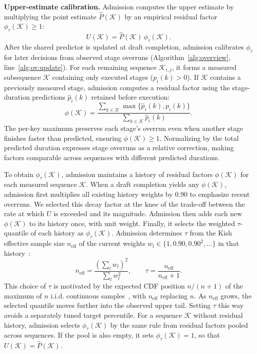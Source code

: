 \smallskip\noindent\textbf{Upper-estimate calibration.}
Admission computes the upper estimate by multiplying the point estimate \(\hat P(\mathcal K)\) by an empirical residual factor \(\phi_\tau(\mathcal K)\geq1\):
\begin{equation*}
  U(\mathcal{K})
  =\hat P(\mathcal{K})\,\phi_{\tau}(\mathcal{K}).
\end{equation*}
After the shared predictor is updated at draft completion, admission calibrates \(\phi_\tau\) for later decisions from observed stage overruns (Algorithm~\ref{alg:overview}, line~\ref{alg:ov:update}).
For each remaining sequence \(\mathcal K_{i,j}\), it forms a measured subsequence \(\mathcal K\) containing only executed stages (\(p_i(k)>0\)).
If \(\mathcal K\) contains a previously measured stage, admission computes a residual factor using the stage-duration predictions \(\hat p_i(k)\) retained before execution:
\begin{equation*}
  \phi(\mathcal{K})
  =\frac{\sum_{k\in\mathcal{K}}\max\{\hat p_i(k),p_i(k)\}}
         {\sum_{k\in\mathcal{K}}\hat p_i(k)}.
\end{equation*}
The per-key maximum preserves each stage's overrun even when another stage finishes faster than predicted, ensuring \(\phi(\mathcal{K})\geq1\).
Normalizing by the total predicted duration expresses stage overruns as a relative correction, making factors comparable across sequences with different predicted durations.

To obtain \(\phi_\tau(\mathcal K)\), admission maintains a history of residual factors \(\phi(\mathcal K)\) for each measured sequence \(\mathcal K\).
When a draft completion yields any \(\phi(\mathcal K)\), admission first multiplies all existing history weights by \(0.90\) to emphasize recent overruns.
We selected this decay factor at the knee of the trade-off between the rate at which \(U\) is exceeded and its magnitude.
Admission then adds each new \(\phi(\mathcal K)\) to its history once, with unit weight.
Finally, it selects the weighted \(\tau\)-quantile of each history as \(\phi_\tau(\mathcal K)\).
Admission determines \(\tau\) from the Kish effective sample size \(n_{\mathrm{eff}}\) of the current weights \(w_l\in\{1,0.90,0.90^2,\ldots\}\) in that history~\cite{kish-survey-sampling}:
\[
  n_{\mathrm{eff}}
  =\frac{(\sum_l w_l)^2}{\sum_l w_l^2},
  \qquad
  \tau=\frac{n_{\mathrm{eff}}}{n_{\mathrm{eff}}+1}.
\]
This choice of \(\tau\) is motivated by the expected CDF position \(n/(n+1)\) of the maximum of \(n\) i.i.d. continuous samples~\cite{david-order-statistics}, with \(n_{\mathrm{eff}}\) replacing \(n\).
As \(n_{\mathrm{eff}}\) grows, the selected quantile moves further into the observed upper tail.
Setting \(\tau\) this way avoids a separately tuned target percentile.
For a sequence \(\mathcal K\) without residual history, admission selects \(\phi_\tau(\mathcal K)\) by the same rule from residual factors pooled across sequences.
If the pool is also empty, it sets \(\phi_\tau(\mathcal K)=1\), so that \(U(\mathcal K)=\hat P(\mathcal K)\).

